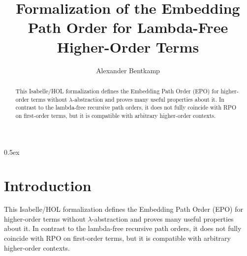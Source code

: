 \documentclass[10pt,a4paper]{article}
\begin{document}
\title{Formalization of the Embedding Path Order for Lambda-Free Higher-Order Terms}
\author{Alexander Bentkamp}

\maketitle

\begin{abstract}
\noindent
This Isabelle/HOL formalization defines the Embedding Path Order (EPO) for
higher-order terms without $\lambda$-abstraction and proves many useful
properties about it. In contrast to the lambda-free recursive path orders,
it does not fully coincide with RPO on first-order terms, but it is compatible
with arbitrary higher-order contexts.
\end{abstract}

\tableofcontents

\parindent 0pt
\parskip 0.5ex

\section{Introduction}

This Isabelle/HOL formalization defines the Embedding Path Order (EPO) for
higher-order terms without $\lambda$-abstraction and proves many useful
properties about it. In contrast to the lambda-free recursive path orders,
it does not fully coincide with RPO on first-order terms, but it is compatible
with arbitrary higher-order contexts.



%
%

%
%
\end{document}
